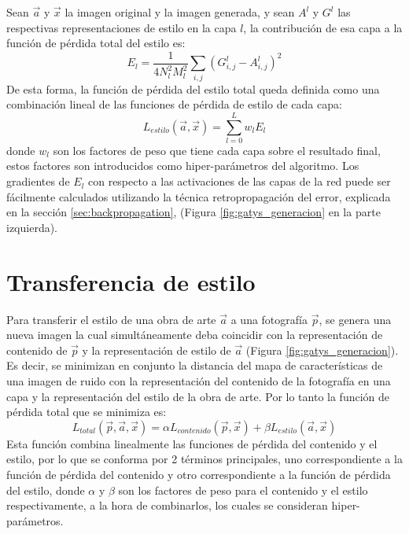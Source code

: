 \documentclass[a4paper,11pt,spanish]{book}
\begin{document}
      Sean $\overrightarrow{a}$ y $\overrightarrow{x}$ la imagen original y la imagen generada, y sean $A^l$ y $G^l$
      las respectivas representaciones de estilo en la capa $l$, la contribución de esa capa a la función de pérdida total del estilo es:
      \begin{equation}
       E_l = \frac{1}{4 N_l^2 M_l^2} \sum_{i,j} (G_{i,j}^l - A_{i,j}^l)^2
      \end{equation}
      De esta forma, la función de pérdida del estilo total queda definida como una combinación lineal de las funciones de pérdida de estilo de cada capa:
      \begin{equation}
       L_{estilo}(\overrightarrow{a},\overrightarrow{x}) = \sum_{l=0}^{L} w_l E_l
      \end{equation}
      donde $w_l$ son los factores de peso que tiene cada capa sobre el resultado final, estos factores son introducidos como hiper-parámetros del algoritmo. 
      Los gradientes de $E_l$ con respecto a las activaciones de las capas de la red puede ser fácilmente
      calculados utilizando la técnica retropropagación del error, explicada en la sección \ref{sec:backpropagation}, (Figura \ref{fig:gatys_generacion} en la parte izquierda).
      
    \section{Transferencia de estilo}
      Para transferir el estilo de una obra de arte $\overrightarrow{a}$ a una fotografía $\overrightarrow{p}$, se genera una nueva imagen
      la cual simultáneamente deba coincidir con la representación de contenido de $\overrightarrow{p}$ y la representación de estilo de $\overrightarrow{a}$ (Figura \ref{fig:gatys_generacion}). 
      Es decir, se minimizan en conjunto la distancia del mapa de características de una imagen de ruido con la representación del contenido de la fotografía
      en una capa y la representación del estilo de la obra de arte. Por lo tanto la función de pérdida total que se minimiza es:
      \begin{equation}\label{eq:objetivo}
       L_{total}(\overrightarrow{p},\overrightarrow{a},\overrightarrow{x}) = \alpha L_{contenido}(\overrightarrow{p},\overrightarrow{x}) + \beta L_{estilo}(\overrightarrow{a},\overrightarrow{x})
      \end{equation}
      Esta función combina linealmente las funciones de pérdida del contenido y el estilo, por lo que se conforma por 2 términos principales, uno correspondiente a la función de pérdida
      del contenido y otro correspondiente a la función de pérdida del estilo, donde $\alpha$ y $\beta$ son los factores de peso para el contenido y el estilo respectivamente,
      a la hora de combinarlos, los cuales se consideran hiper-parámetros. 
      
\end{document}
